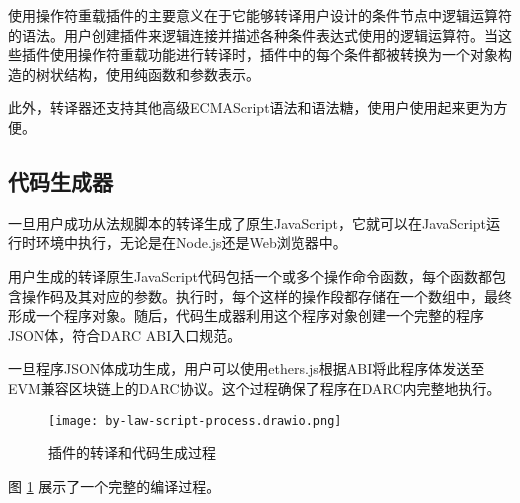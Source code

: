 \documentclass[main.tex]{subfiles}
\begin{document}
使用操作符重载插件的主要意义在于它能够转译用户设计的条件节点中逻辑运算符的语法。用户创建插件来逻辑连接并描述各种条件表达式使用的逻辑运算符。当这些插件使用操作符重载功能进行转译时，插件中的每个条件都被转换为一个对象构造的树状结构，使用纯函数和参数表示。

此外，转译器还支持其他高级ECMAScript语法和语法糖，使用户使用起来更为方便。

\subsection{代码生成器}

一旦用户成功从法规脚本的转译生成了原生JavaScript，它就可以在JavaScript运行时环境中执行，无论是在Node.js还是Web浏览器中。

用户生成的转译原生JavaScript代码包括一个或多个操作命令函数，每个函数都包含操作码及其对应的参数。执行时，每个这样的操作段都存储在一个数组中，最终形成一个程序对象。随后，代码生成器利用这个程序对象创建一个完整的程序JSON体，符合DARC ABI入口规范。

一旦程序JSON体成功生成，用户可以使用ethers.js根据ABI将此程序体发送至EVM兼容区块链上的DARC协议。这个过程确保了程序在DARC内完整地执行。

\begin{figure}
\centering
\texttt{[image: by-law-script-process.drawio.png]}
\caption{\label{fig:by-law-plugin}插件的转译和代码生成过程}
\end{figure}

图 \ref{fig:by-law-plugin} 展示了一个完整的编译过程。
\end{document}
